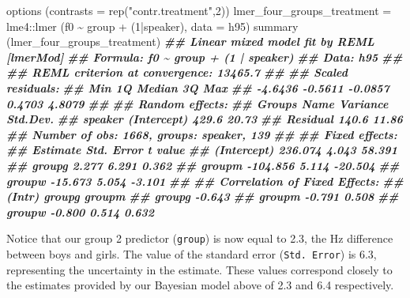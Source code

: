 \documentclass[
]{book}
\newenvironment{Shaded}{\begin{snugshade}}{\end{snugshade}}
\newcommand{\AttributeTok}[1]{\textcolor[rgb]{0.77,0.63,0.00}{#1}}
\newcommand{\DecValTok}[1]{\textcolor[rgb]{0.00,0.00,0.81}{#1}}
\newcommand{\DocumentationTok}[1]{\textcolor[rgb]{0.56,0.35,0.01}{\textbf{\textit{#1}}}}
\newcommand{\FunctionTok}[1]{\textcolor[rgb]{0.00,0.00,0.00}{#1}}
\newcommand{\NormalTok}[1]{#1}
\newcommand{\OtherTok}[1]{\textcolor[rgb]{0.56,0.35,0.01}{#1}}
\newcommand{\SpecialCharTok}[1]{\textcolor[rgb]{0.00,0.00,0.00}{#1}}
\newcommand{\StringTok}[1]{\textcolor[rgb]{0.31,0.60,0.02}{#1}}
\begin{document}
\begin{Shaded}
\begin{Highlighting}[]
\FunctionTok{options}\NormalTok{ (}\AttributeTok{contrasts =} \FunctionTok{rep}\NormalTok{(}\StringTok{"contr.treatment"}\NormalTok{,}\DecValTok{2}\NormalTok{))}
\NormalTok{lmer\_four\_groups\_treatment }\OtherTok{=}\NormalTok{ lme4}\SpecialCharTok{::}\FunctionTok{lmer}\NormalTok{ (f0 }\SpecialCharTok{\textasciitilde{}}\NormalTok{ group }\SpecialCharTok{+}\NormalTok{ (}\DecValTok{1}\SpecialCharTok{|}\NormalTok{speaker), }\AttributeTok{data =}\NormalTok{ h95)}
\FunctionTok{summary}\NormalTok{ (lmer\_four\_groups\_treatment)}
\DocumentationTok{\#\# Linear mixed model fit by REML [\textquotesingle{}lmerMod\textquotesingle{}]}
\DocumentationTok{\#\# Formula: f0 \textasciitilde{} group + (1 | speaker)}
\DocumentationTok{\#\#    Data: h95}
\DocumentationTok{\#\# }
\DocumentationTok{\#\# REML criterion at convergence: 13465.7}
\DocumentationTok{\#\# }
\DocumentationTok{\#\# Scaled residuals: }
\DocumentationTok{\#\#     Min      1Q  Median      3Q     Max }
\DocumentationTok{\#\# {-}4.6436 {-}0.5611 {-}0.0857  0.4703  4.8079 }
\DocumentationTok{\#\# }
\DocumentationTok{\#\# Random effects:}
\DocumentationTok{\#\#  Groups   Name        Variance Std.Dev.}
\DocumentationTok{\#\#  speaker  (Intercept) 429.6    20.73   }
\DocumentationTok{\#\#  Residual             140.6    11.86   }
\DocumentationTok{\#\# Number of obs: 1668, groups:  speaker, 139}
\DocumentationTok{\#\# }
\DocumentationTok{\#\# Fixed effects:}
\DocumentationTok{\#\#             Estimate Std. Error t value}
\DocumentationTok{\#\# (Intercept)  236.074      4.043  58.391}
\DocumentationTok{\#\# groupg         2.277      6.291   0.362}
\DocumentationTok{\#\# groupm      {-}104.856      5.114 {-}20.504}
\DocumentationTok{\#\# groupw       {-}15.673      5.054  {-}3.101}
\DocumentationTok{\#\# }
\DocumentationTok{\#\# Correlation of Fixed Effects:}
\DocumentationTok{\#\#        (Intr) groupg groupm}
\DocumentationTok{\#\# groupg {-}0.643              }
\DocumentationTok{\#\# groupm {-}0.791  0.508       }
\DocumentationTok{\#\# groupw {-}0.800  0.514  0.632}
\end{Highlighting}
\end{Shaded}

Notice that our group 2 predictor (\texttt{group}) is now equal to 2.3, the Hz difference between boys and girls. The value of the standard error (\texttt{Std.\ Error}) is 6.3, representing the uncertainty in the estimate. These values correspond closely to the estimates provided by our Bayesian model above of 2.3 and 6.4 respectively.
\end{document}
